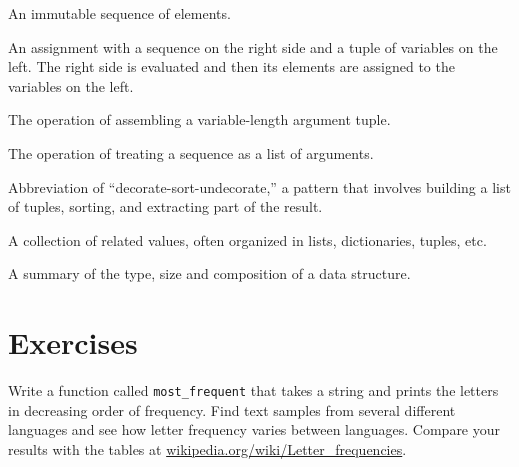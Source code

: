 \begin{vocabulary}[tuple:] An immutable sequence of elements.
\end{vocabulary}
	
\begin{vocabulary} An assignment with a sequence on the
right side and a tuple of variables on the left.  The right
side is evaluated and then its elements are assigned to the
variables on the left.
\end{vocabulary}
	
\begin{vocabulary}[gather:] The operation of assembling a variable-length
argument tuple.
\end{vocabulary}
	
\begin{vocabulary}[scatter:] The operation of treating a sequence as a list of
arguments.
\end{vocabulary}
	
\begin{vocabulary}[DSU:] Abbreviation of ``decorate-sort-undecorate,'' a
pattern that involves building a list of tuples, sorting, and
extracting part of the result.
\end{vocabulary}
	
\begin{vocabulary} A collection of related values, often
organized in lists, dictionaries, tuples, etc.
\end{vocabulary}
	
\begin{vocabulary} A summary of the type,
size and composition of a data structure.
\end{vocabulary}
	


\section{Exercises}

\begin{exercise}
Write a function called \verb"most_frequent" that takes a string and
prints the letters in decreasing order of frequency.  Find text
samples from several different languages and see how letter frequency
varies between languages.  Compare your results with the tables at
\url{wikipedia.org/wiki/Letter_frequencies}.


\end{exercise}


